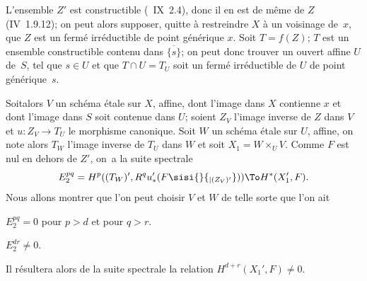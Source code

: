 L'ensemble $Z'$ est constructible (~IX~2.4), donc il en est de m\^eme de $Z$ (\EGA IV~1.9.12); on peut alors supposer, quitte \`a restreindre $X$ \`a un voisinage de~$x$, que $Z$ est un ferm\'e irr\'eductible de point g\'en\'erique $x$. Soit $T=f(Z)$; $T$ est un ensemble constructible contenu dans $\overline{\{s\}}$; on peut donc trouver un ouvert affine $U$ de~$S$, tel que $s \in U$ et que $T \cap U = T_U$ soit un ferm\'e irr\'eductible de $U$ de point g\'en\'erique~$s$.

Soit\pageoriginale alors $V$ un sch\'ema \'etale sur $X$, affine, dont l'image dans $X$ contienne $x$ et dont l'image dans $S$ soit contenue dans $U$; soient $Z_V$ l'image inverse de $Z$ dans $V$ et $u: Z_V \to T_U$ le morphisme canonique. Soit $W$ un sch\'ema \'etale sur $U$, affine, on note alors $T_W$ l'image inverse de $T_U$ dans $W$ et soit $X_1 = W\times_U V$. Comme $F$ est nul en dehors de $Z'$, on~a la suite spectrale
$$
E^{pq}_2 = H^p((T_W)', R^qu_*'(F\sisi{}{_{|(Z_V)'}})) \To H^*(X'_1, F).
$$
Nous allons montrer que l'on peut choisir $V$ et $W$ de telle sorte que l'on ait
\begin{enumeratea}
\item
$E^{pq}_2=0$ pour $p>d$ et pour $q>r$.
\item
$E^{dr}_2 \neq 0$.
\end{enumeratea}
\noindent
Il r\'esultera alors de la suite spectrale la relation $H^{d+r}(X_1', F) \neq 0$.
